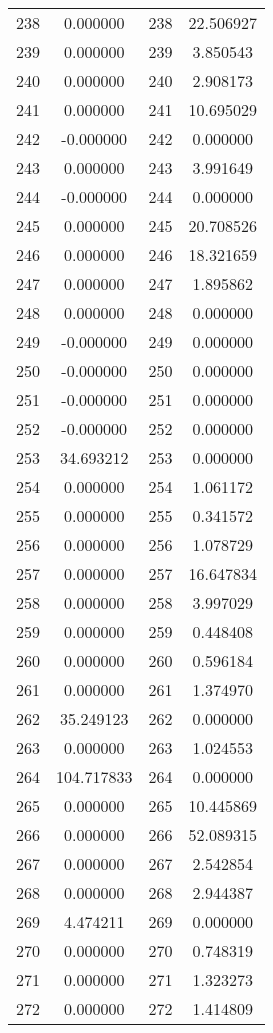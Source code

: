 \documentclass[12pt]{article}
\begin{document}
\begin{longtable}{@{}cccc@{}}
238 & 0.000000 & 238 & 22.506927 \\
239 & 0.000000 & 239 & 3.850543 \\
240 & 0.000000 & 240 & 2.908173 \\
241 & 0.000000 & 241 & 10.695029 \\
242 & -0.000000 & 242 & 0.000000 \\
243 & 0.000000 & 243 & 3.991649 \\
244 & -0.000000 & 244 & 0.000000 \\
245 & 0.000000 & 245 & 20.708526 \\
246 & 0.000000 & 246 & 18.321659 \\
247 & 0.000000 & 247 & 1.895862 \\
248 & 0.000000 & 248 & 0.000000 \\
249 & -0.000000 & 249 & 0.000000 \\
250 & -0.000000 & 250 & 0.000000 \\
251 & -0.000000 & 251 & 0.000000 \\
252 & -0.000000 & 252 & 0.000000 \\
253 & 34.693212 & 253 & 0.000000 \\
254 & 0.000000 & 254 & 1.061172 \\
255 & 0.000000 & 255 & 0.341572 \\
256 & 0.000000 & 256 & 1.078729 \\
257 & 0.000000 & 257 & 16.647834 \\
258 & 0.000000 & 258 & 3.997029 \\
259 & 0.000000 & 259 & 0.448408 \\
260 & 0.000000 & 260 & 0.596184 \\
261 & 0.000000 & 261 & 1.374970 \\
262 & 35.249123 & 262 & 0.000000 \\
263 & 0.000000 & 263 & 1.024553 \\
264 & 104.717833 & 264 & 0.000000 \\
265 & 0.000000 & 265 & 10.445869 \\
266 & 0.000000 & 266 & 52.089315 \\
267 & 0.000000 & 267 & 2.542854 \\
268 & 0.000000 & 268 & 2.944387 \\
269 & 4.474211 & 269 & 0.000000 \\
270 & 0.000000 & 270 & 0.748319 \\
271 & 0.000000 & 271 & 1.323273 \\
272 & 0.000000 & 272 & 1.414809 \\

\end{longtable}
\end{document}

